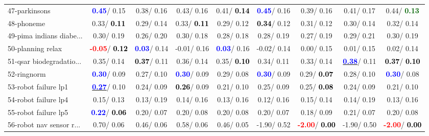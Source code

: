 \begin{table}[h]
\begin{center}
\begin{tabular}{lc|c|c|c|c|c|c|c}
47-parkinsons & \textcolor{blue}{\textbf{  0.45}}/  0.15 &   0.38/  0.16 &   0.43/  0.16 &   0.41/\textcolor{black}{\textbf{  0.14}} & \textcolor{blue}{\textbf{  0.45}}/  0.16 &   0.39/  0.16 &   0.41/  0.17 &   0.44/\textcolor{darkgreen}{\textbf{  0.13}} \\
48-phoneme &   0.33/\textcolor{black}{\textbf{  0.11}} &   0.29/  0.14 &   0.33/\textcolor{black}{\textbf{  0.11}} &   0.29/  0.12 & \textcolor{black}{\textbf{  0.34}}/  0.12 &   0.31/  0.12 &   0.30/  0.14 &   0.32/  0.14 \\
49-pima indians diabe... &   0.30/  0.19 &   0.26/  0.20 &   0.30/  0.18 &   0.28/  0.18 &   0.28/  0.19 &   0.27/  0.19 &   0.29/  0.21 &   0.30/  0.19 \\
50-planning relax & \textcolor{red}{\textbf{ -0.05}}/\textcolor{black}{\textbf{  0.12}} & \textcolor{blue}{\textbf{  0.03}}/  0.14 &  -0.01/  0.16 & \textcolor{blue}{\textbf{  0.03}}/  0.16 &  -0.02/  0.14 &   0.00/  0.15 &   0.01/  0.15 &   0.02/  0.14 \\
51-qsar biodegradatio... &   0.35/  0.14 & \textcolor{black}{\textbf{  0.37}}/  0.11 &   0.36/  0.14 &   0.35/\textcolor{black}{\textbf{  0.10}} &   0.34/  0.11 &   0.33/  0.14 & \underline{\textcolor{blue}{\textbf{  0.38}}}/  0.11 & \textcolor{black}{\textbf{  0.37}}/\textcolor{black}{\textbf{  0.10}} \\
52-ringnorm & \textcolor{blue}{\textbf{  0.30}}/  0.09 &   0.27/  0.10 & \textcolor{blue}{\textbf{  0.30}}/  0.09 &   0.29/  0.08 & \textcolor{blue}{\textbf{  0.30}}/  0.09 &   0.29/\textcolor{black}{\textbf{  0.07}} &   0.28/  0.10 & \textcolor{blue}{\textbf{  0.30}}/  0.08 \\
53-robot failure lp1 & \underline{\textcolor{blue}{\textbf{  0.27}}}/  0.10 &   0.24/  0.09 & \textcolor{black}{\textbf{  0.26}}/  0.09 &   0.21/  0.10 &   0.25/  0.09 &   0.25/\textcolor{black}{\textbf{  0.08}} &   0.24/  0.09 &   0.21/  0.10 \\ \hline
54-robot failure lp4 &   0.15/  0.13 &   0.13/  0.19 &   0.14/  0.16 &   0.13/  0.16 &   0.12/  0.16 &   0.15/  0.14 &   0.14/  0.19 &   0.13/  0.16 \\
55-robot failure lp5 & \textcolor{blue}{\textbf{  0.22}}/\textcolor{black}{\textbf{  0.06}} &   0.20/  0.07 &   0.20/  0.08 &   0.20/  0.08 &   0.20/  0.07 &   0.18/  0.09 &   0.21/  0.07 &   0.20/  0.08 \\
56-robot nav sensor r... &   0.70/  0.06 &   0.46/  0.06 &   0.58/  0.06 &   0.46/  0.05 &  -1.90/  0.52 & \textcolor{red}{\textbf{ -2.00}}/\textcolor{black}{\textbf{  0.00}} &  -1.90/  0.50 & \textcolor{red}{\textbf{ -2.00}}/\textcolor{black}{\textbf{  0.00}} \\

\end{tabular}
\end{center}
\end{table}
